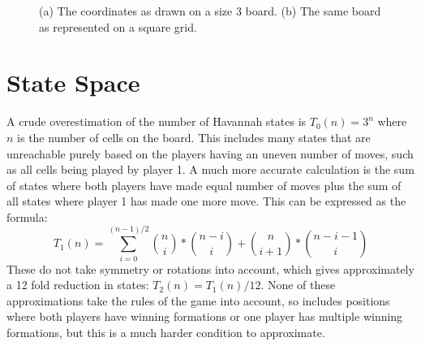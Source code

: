 \begin{figure}
\centering
\caption{(a) The coordinates as drawn on a size 3 board. (b) The same board as represented on a square grid.}
\label{fig:coordinates}
\end{figure}


\section{State Space}

A crude overestimation of the number of Havannah states is $T_0(n) = 3^n$ where $n$ is the number of cells on the board. This includes many states that are unreachable purely based on the players having an uneven number of moves, such as all cells being played by player 1. A much more accurate calculation is the sum of states where both players have made equal number of moves plus the sum of all states where player 1 has made one more move. This can be expressed as the formula:
$$T_1(n) = \sum_{i = 0}^{(n-1)/2} {n \choose i}*{n-i \choose i} + {n \choose i + 1}*{n - i - 1 \choose i}$$
These do not take symmetry or rotations into account, which gives approximately a 12 fold reduction in states: $T_2(n) = T_1(n)/12$. None of these approximations take the rules of the game into account, so includes positions where both players have winning formations or one player has multiple winning formations, but this is a much harder condition to approximate.

